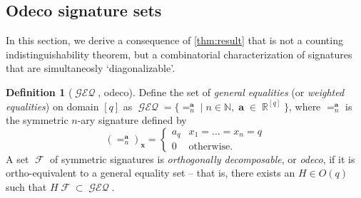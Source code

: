 \documentclass{article}
\theoremstyle{remark}
\theoremstyle{definition}
\newtheorem{definition}{Definition}[section]
\DeclareMathOperator{\rr}{\mathbb{R}}
\DeclareMathOperator{\vx}{\mathbf{x}}
\DeclareMathOperator{\va}{\mathbf{a}}
\DeclareMathOperator{\fc}{\mathcal{F}}
\DeclareMathOperator{\geneq}{\mathcal{GEQ}}
\begin{document}
\subsection{Odeco signature sets}
In this section, we derive a consequence of \autoref{thm:result} that is not a counting
indistinguishability theorem,
but a combinatorial characterization of signatures that are simultaneosly `diagonalizable'.
\begin{definition}[$\geneq$, odeco]
    Define the set of \emph{general equalities} (or \emph{weighted equalities}) on domain $[q]$ as
    $\geneq = \{=_n^{\va} \mid n \in \mathbb{N}, \va \in \rr^{[q]}\}$, where $=_n^{\va}$ is the symmetric
    $n$-ary signature defined by
    \[
        (=_n^{\va})_{\vx} = \begin{cases} a_q & x_1 = \ldots = x_n = q \\ 0 & \text{otherwise}.
        \end{cases}
    \]
    A set $\fc$ of symmetric signatures is \emph{orthogonally decomposable}, or \emph{odeco}, if it is ortho-equivalent
    to a general equality set -- that is, there exists an $H \in O(q)$ such that $H\fc \subset \geneq$.
\end{definition}
\end{document}
